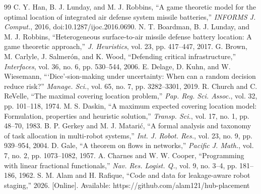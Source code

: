 \documentclass[10pt,twocolumn,letterpaper]{article}
\theoremstyle{remark}
\begin{document}
\begin{thebibliography}{99}
 C. Y. Han, B. J. Lunday, and M. J. Robbins, ``A game theoretic model for the optimal location of integrated air defense system missile batteries,'' \emph{INFORMS J. Comput.}, 2016, doi:10.1287/ijoc.2016.0690.
 N. T. Boardman, B. J. Lunday, and M. J. Robbins, ``Heterogeneous surface-to-air missile defense battery location: A game theoretic approach,'' \emph{J. Heuristics}, vol. 23, pp. 417--447, 2017.
 G. Brown, M. Carlyle, J. Salmer\'on, and K. Wood, ``Defending critical infrastructure,'' \emph{Interfaces}, vol. 36, no. 6, pp. 530--544, 2006.
 E. Delage, D. Kuhn, and W. Wiesemann, ```Dice'-sion-making under uncertainty: When can a random decision reduce risk?'' \emph{Manage. Sci.}, vol. 65, no. 7, pp. 3282--3301, 2019.
 R. Church and C. ReVelle, ``The maximal covering location problem,'' \emph{Pap. Reg. Sci. Assoc.}, vol. 32, pp. 101--118, 1974.
 M. S. Daskin, ``A maximum expected covering location model: Formulation, properties and heuristic solution,'' \emph{Transp. Sci.}, vol. 17, no. 1, pp. 48--70, 1983.
 B. P. Gerkey and M. J. Matari\'c, ``A formal analysis and taxonomy of task allocation in multi-robot systems,'' \emph{Int. J. Robot. Res.}, vol. 23, no. 9, pp. 939--954, 2004.
 D. Gale, ``A theorem on flows in networks,'' \emph{Pacific J. Math.}, vol. 7, no. 2, pp. 1073--1082, 1957.
 A. Charnes and W. W. Cooper, ``Programming with linear fractional functionals,'' \emph{Nav. Res. Logist. Q.}, vol. 9, no. 3--4, pp. 181--186, 1962.
 S. M. Alam and H. Rafique, ``Code and data for leakage-aware robot staging,'' 2026. [Online]. Available: https://github.com/alam121/hub-placement
\end{thebibliography}
\end{document}
